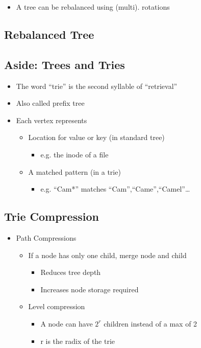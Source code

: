\begin{itemize}
	\item A tree can be rebalanced using (multi). rotations
\end{itemize}

\subsection{Rebalanced Tree}

\subsection{Aside: Trees and Tries}

\begin{itemize}
	\item The word ``trie'' is the second syllable of ``retrieval''
	\item Also called prefix tree
	\item Each vertex represents
	\begin{itemize}
		\item Location for value or key (in standard tree)
		\begin{itemize}
			\item e.g. the inode of a file
		\end{itemize}
		\item A matched pattern (in a trie)
		\begin{itemize}
			\item e.g. ``Cam*'' matches
				``Cam'',``Came'',``Camel''\ldots
		\end{itemize}
	\end{itemize}
\end{itemize}

\subsection{Trie Compression}

\begin{itemize}
	\item Path Compressions
	\begin{itemize}
		\item If a node has only one child, merge node and child
		\begin{itemize}
			\item Reduces tree depth
			\item Increases node storage required
		\end{itemize}
		\item Level compression
		\begin{itemize}
			\item A node can have  $2^r$ children instead of a max
				of 2
			\item r is the radix of the trie
		\end{itemize}
	\end{itemize}
\end{itemize}

